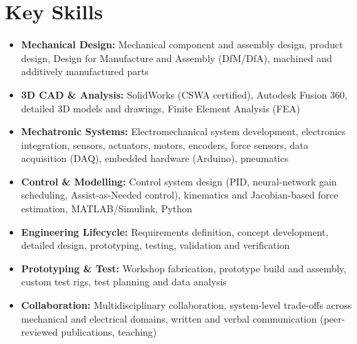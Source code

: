\documentclass[10pt,a4paper]{article}
\begin{document}
\section{Key Skills}
\begin{itemize}
\item \textbf{Mechanical Design:} Mechanical component and assembly design, product design, Design for Manufacture and Assembly (DfM/DfA), machined and additively manufactured parts
\item \textbf{3D CAD \& Analysis:} SolidWorks (CSWA certified), Autodesk Fusion 360, detailed 3D models and drawings, Finite Element Analysis (FEA)
\item \textbf{Mechatronic Systems:} Electromechanical system development, electronics integration, sensors, actuators, motors, encoders, force sensors, data acquisition (DAQ), embedded hardware (Arduino), pneumatics
\item \textbf{Control \& Modelling:} Control system design (PID, neural-network gain scheduling, Assist-as-Needed control), kinematics and Jacobian-based force estimation, MATLAB/Simulink, Python
\item \textbf{Engineering Lifecycle:} Requirements definition, concept development, detailed design, prototyping, testing, validation and verification
\item \textbf{Prototyping \& Test:} Workshop fabrication, prototype build and assembly, custom test rigs, test planning and data analysis
\item \textbf{Collaboration:} Multidisciplinary collaboration, system-level trade-offs across mechanical and electrical domains, written and verbal communication (peer-reviewed publications, teaching)
\end{itemize}
\end{document}
